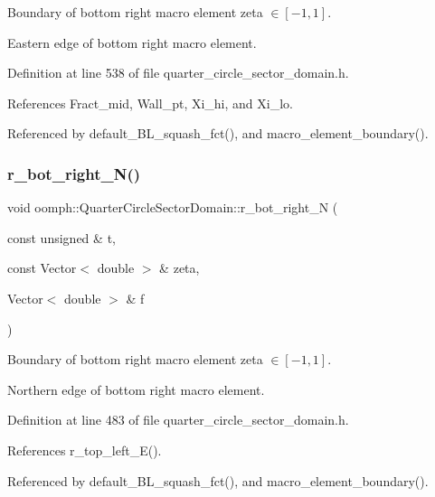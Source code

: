 Boundary of bottom right macro element zeta $ \in [-1,1] $. 

Eastern edge of bottom right macro element. 

Definition at line 538 of file quarter\+\_\+circle\+\_\+sector\+\_\+domain.\+h.



References Fract\+\_\+mid, Wall\+\_\+pt, Xi\+\_\+hi, and Xi\+\_\+lo.



Referenced by default\+\_\+\+B\+L\+\_\+squash\+\_\+fct(), and macro\+\_\+element\+\_\+boundary().

\mbox{\label{classoomph_1_1QuarterCircleSectorDomain_ad937b0da664b5c01063e7f8de6427fce}} 
\subsubsection{\texorpdfstring{r\+\_\+bot\+\_\+right\+\_\+\+N()}{r\_bot\_right\_N()}}
{\footnotesize\ttfamily void oomph\+::\+Quarter\+Circle\+Sector\+Domain\+::r\+\_\+bot\+\_\+right\+\_\+N (\begin{DoxyParamCaption}\item[{const unsigned \&}]{t,  }\item[{const Vector$<$ double $>$ \&}]{zeta,  }\item[{Vector$<$ double $>$ \&}]{f }\end{DoxyParamCaption})\hspace{0.3cm}{\ttfamily [private]}}



Boundary of bottom right macro element zeta $ \in [-1,1] $. 

Northern edge of bottom right macro element. 

Definition at line 483 of file quarter\+\_\+circle\+\_\+sector\+\_\+domain.\+h.



References r\+\_\+top\+\_\+left\+\_\+\+E().



Referenced by default\+\_\+\+B\+L\+\_\+squash\+\_\+fct(), and macro\+\_\+element\+\_\+boundary().

